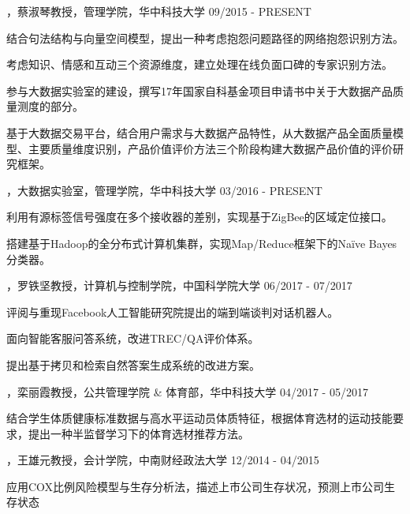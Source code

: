 

\begin{cventries}

\cvexperience
{，蔡淑琴教授，管理学院，华中科技大学}
{09/2015 - PRESENT}
{
    \begin{cvitems}
    \item {结合句法结构与向量空间模型，提出一种考虑抱怨问题路径的网络抱怨识别方法。}
    \item {考虑知识、情感和互动三个资源维度，建立处理在线负面口碑的专家识别方法。}
    \item {参与大数据实验室的建设，撰写17年国家自科基金项目申请书中关于大数据产品质量测度的部分。}
    \item {基于大数据交易平台，结合用户需求与大数据产品特性，从大数据产品全面质量模型、主要质量维度识别，产品价值评价方法三个阶段构建大数据产品价值的评价研究框架。}
    \end{cvitems}
}

\cvexperience
{，大数据实验室，管理学院，华中科技大学}
{03/2016 - PRESENT}
{
    \begin{cvitems}
    \item {利用有源标签信号强度在多个接收器的差别，实现基于ZigBee的区域定位接口。}
    \item {搭建基于Hadoop的全分布式计算机集群，实现Map/Reduce框架下的Naïve Bayes分类器。}
    \end{cvitems}
}

\cvexperience
{，罗铁坚教授，计算机与控制学院，中国科学院大学}
{06/2017 - 07/2017}
{
    \begin{cvitems}
    \item {评阅与重现Facebook人工智能研究院提出的端到端谈判对话机器人。}
    \item {面向智能客服问答系统，改进TREC/QA评价体系。}
    \item {提出基于拷贝和检索自然答案生成系统的改进方案。}
    \end{cvitems}
}

\cvexperience
{，栾丽霞教授，公共管理学院 \& 体育部，华中科技大学}
{04/2017 - 05/2017}
{
    \begin{cvitems}
    \item {结合学生体质健康标准数据与高水平运动员体质特征，根据体育选材的运动技能要求，提出一种半监督学习下的体育选材推荐方法。}
    \end{cvitems}
}

\cvexperience
{，王雄元教授，会计学院，中南财经政法大学}
{12/2014 - 04/2015}
{
    \begin{cvitems}
    \item {应用COX比例风险模型与生存分析法，描述上市公司生存状况，预测上市公司生存状态}
    \end{cvitems}
}
\end{cventries}